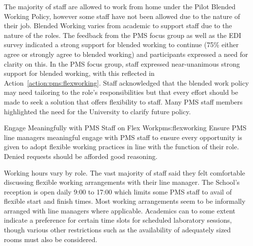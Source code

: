 The majority of staff are allowed to work from home under the Pilot Blended Working Policy, however some staff have not been allowed due to the nature of their job.
Blended Working varies from academic to support staff due to the nature of the roles. The feedback from the PMS focus group as well as the EDI survey indicated a strong support for blended working to continue (75\% either agree or strongly agree to blended working) and participants expressed a need for clarity on this.
In the PMS focus group, staff expressed near-unanimous strong support for blended working, with this reflected in Action~\ref{action:pms:flexworking}. Staff acknowledged that the blended work policy may need tailoring to the role’s responsibilities but that every effort should be made to seek a solution that offers flexibility to staff. Many PMS staff members highlighted the need for the University to clarify future policy. 

\newcommand{\actpmsflexworking}{Ensure PMS line managers meaningful engage with PMS staff to ensure every opportunity is given to adopt flexible working practices in line with the function of their role. Denied requests should be afforded good reasoning. }

\begin{actionblock}{\ksspace{}Engage Meaningfully with PMS Staff on Flex Work}{pms:flexworking}
\actpmsflexworking
\hfill{
    \hypersetup{hidelinks}
    \hyperlink{d9}{\gotoactionsymbol{}}
}
\end{actionblock}

 

Working hours vary by role. The vast majority of staff said they felt comfortable discussing flexible working arrangements with their line manager. The School's reception is open daily 9:00 to 17:00 which limits some PMS staff to avail of flexible start and finish times. Most working arrangements seem to be informally arranged with line managers where applicable.  
Academics can to some extent indicate a preference for certain time slots for scheduled laboratory sessions, though various other restrictions such as the availability of adequately sized rooms must also be considered. 

